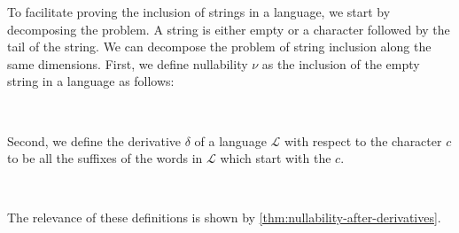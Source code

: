 To facilitate proving the inclusion of strings in a language, we start by decomposing the problem. A string is either empty or a character followed by the tail of the string. We can decompose the problem of string inclusion along the same dimensions. First, we define nullability $ν$ as the inclusion of the empty string in a language as follows:
\begin{code}%
%
\>[4]\AgdaSpace{}%
\AgdaSymbol{:}\AgdaSpace{}%
\AgdaSpace{}%
\AgdaSpace{}%
\<%
\\
%
\>[4]\AgdaSpace{}%
\AgdaSpace{}%
\AgdaSymbol{=}\AgdaSpace{}%
\AgdaSpace{}%
\AgdaInductiveConstructor{[]}\<%
\end{code}
Second, we define the derivative $δ$ of a language $ℒ$ with respect to the character $c$ to be all the suffixes of the words in $ℒ$ which start with the $c$.
\begin{code}%
%
\>[4]\AgdaSpace{}%
\AgdaSymbol{:}\AgdaSpace{}%
\AgdaSpace{}%
\AgdaSpace{}%
\AgdaSpace{}%
\AgdaSpace{}%
\<%
\\
%
\>[4]\AgdaSpace{}%
\AgdaSpace{}%
\AgdaSpace{}%
\AgdaSymbol{=}\AgdaSpace{}%
\AgdaSpace{}%
\AgdaSpace{}%
\AgdaSpace{}%
\AgdaSpace{}%
\AgdaSymbol{(}\AgdaSpace{}%
\AgdaSpace{}%
\AgdaSymbol{)}\<%
\end{code}
The relevance of these definitions is shown by \cref{thm:nullability-after-derivatives}.
